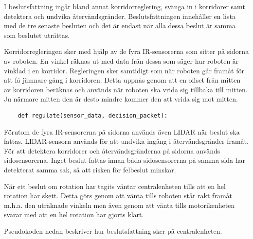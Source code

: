 \documentclass[a4paper,titlepage,12pt]{article}
\begin{document}
    I beslutsfattning ingår bland annat korridorreglering, svänga in i korridorer samt detektera
    och undvika återvändsgränder. Beslutsfattningen innehåller en lista med de tre senaste besluten och det är endast när alla dessa beslut är samma som beslutet uträttas. 
    
    Korridorregleringen sker med hjälp av de fyra IR-sensorerna som sitter på
    sidorna av roboten. En vinkel räknas ut med data från dessa som säger
    hur roboten är vinklad i en korridor. Regleringen sker samtidigt som när
    roboten går framåt för att få jämnare gång i korridoren. Detta uppnås genom
    att en offset från mitten av korridoren beräknas och används när roboten ska
    vrida sig tillbaka till mitten. Ju närmare mitten den är desto mindre kommer
    den att vrida sig mot mitten.

    \begin{lstlisting}
    def regulate(sensor_data, decision_packet):
    \end{lstlisting}

    Förutom de fyra IR-sensorerna på sidorna används även LIDAR när beslut ska fattas. 
    LIDAR-sensorn används för att undvika ingång i återvändsgränder framåt. 
    För att detektera korridorer och återvändsgränderna på sidorna används
    sidosensorerna. Inget beslut fattas innan båda sidosensorerna på samma sida
    har detekterat samma sak, så att risken för felbeslut minskar.

    När ett beslut om rotation har tagits väntar centralenheten tills att en hel
    rotation har skett. Detta görs genom att vänta tills roboten står rakt framåt m.h.a.
    den uträknade vinkeln men även genom att vänta tills motorikenheten svarar
    med att en hel rotation har gjorts klart.  

    Pseudokoden nedan beskriver hur beslutsfattning sker på centralenheten.
    
\end{document}
